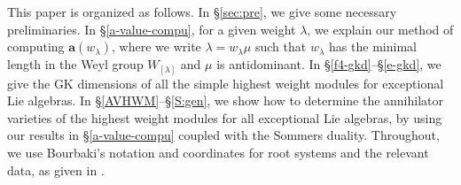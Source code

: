 \documentclass[reqno,12pt]{amsart}
\numberwithin{equation}{section}
\theoremstyle{plain}
\theoremstyle{definition}
\newtheorem{ex}[Thm]{Example}
\newtheorem{Rem}[Thm]{Remark}
\newcommand{\lam}{\lambda}
\newcommand{\aff}{ \mathbf{a} }
\newcommand{\gkd}{\operatorname{GKdim}}
\newcommand{\hobox}[3]{\draw (0+#1,0-#2) rectangle (1+#1,-1-#2)++(-0.5,+0.5) node {$ #3$};}
\newcommand{\domscale}{0.51}
\newcommand{\od}{^{\mathrm{odd}}}
\begin{document}







 




This paper is organized as follows. In \S\ref{sec:pre}, we give some necessary preliminaries. In \S \ref{a-value-compu}, for a given weight $\lam$, we explain our method of computing $\aff(w_{\lam})$, where we write $\lam=w_{\lam}\mu$ such that  $w_{\lam}$  has the minimal length in the Weyl group $W_{[\lam]}$ and $\mu $ is antidominant. In \S \ref{f4-gkd}--\S\ref{e-gkd}, we give  the GK dimensions of all the simple highest weight modules for exceptional Lie algebras. In \S\ref{AVHWM}--\S\ref{S:gen},   we show how to determine the annihilator varieties of the highest weight  modules for all exceptional Lie algebras, by using our results in \S \ref{a-value-compu} coupled with the Sommers duality. Throughout, we use Bourbaki's notation and coordinates for root systems and the relevant data, as given in \cite{Bour}.
\end{document}
